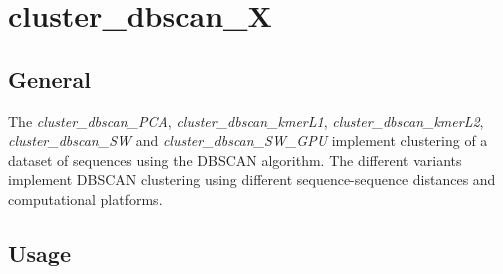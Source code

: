 \section{cluster\_dbscan\_X} \label{sec-dbscan-cluster}

\subsection{General}

The \emph{cluster\_dbscan\_PCA}, \emph{cluster\_dbscan\_kmerL1},
\emph{cluster\_dbscan\_kmerL2}, \emph{cluster\_dbscan\_SW} and
\emph{cluster\_dbscan\_SW\_GPU} implement clustering of a dataset of
sequences using the DBSCAN \cite{dbscan} algorithm. The different
variants implement DBSCAN clustering using different sequence-sequence
distances and computational platforms. 

\subsection{Usage}

